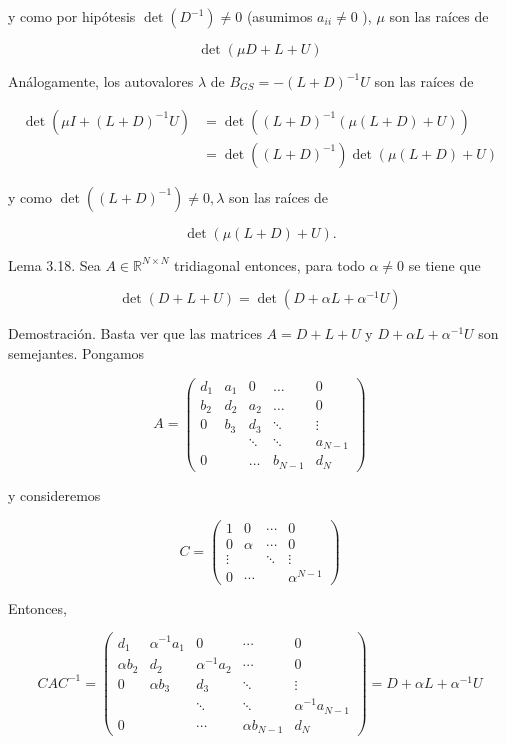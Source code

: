 \documentclass[10pt]{book}
\begin{document}
y como por hipótesis $\operatorname{det}\left(D^{-1}\right) \neq 0$ (asumimos $a_{i i} \neq 0$ ), $\mu$ son las raíces de

$$
\operatorname{det}(\mu D+L+U)
$$

Análogamente, los autovalores $\lambda$ de $B_{G S}=-(L+D)^{-1} U$ son las raíces de

$$
\begin{aligned}
\operatorname{det}\left(\mu I+(L+D)^{-1} U\right) & =\operatorname{det}\left((L+D)^{-1}(\mu(L+D)+U)\right) \\
& =\operatorname{det}\left((L+D)^{-1}\right) \operatorname{det}(\mu(L+D)+U)
\end{aligned}
$$

y como $\operatorname{det}\left((L+D)^{-1}\right) \neq 0, \lambda$ son las raíces de

$$
\operatorname{det}(\mu(L+D)+U) .
$$

Lema 3.18. Sea $A \in \mathbb{R}^{N \times N}$ tridiagonal entonces, para todo $\alpha \neq 0$ se tiene que

$$
\operatorname{det}(D+L+U)=\operatorname{det}\left(D+\alpha L+\alpha^{-1} U\right)
$$

Demostración. Basta ver que las matrices $A=D+L+U$ y $D+\alpha L+\alpha^{-1} U$ son semejantes. Pongamos

$$
A=\left(\begin{array}{ccccc}
d_{1} & a_{1} & 0 & \ldots & 0 \\
b_{2} & d_{2} & a_{2} & \ldots & 0 \\
0 & b_{3} & d_{3} & \ddots & \vdots \\
& & \ddots & \ddots & a_{N-1} \\
0 & & \ldots & b_{N-1} & d_{N}
\end{array}\right)
$$

y consideremos

$$
C=\left(\begin{array}{cccc}
1 & 0 & \cdots & 0 \\
0 & \alpha & \cdots & 0 \\
\vdots & & \ddots & \vdots \\
0 & \cdots & & \alpha^{N-1}
\end{array}\right)
$$

Entonces,

$$
C A C^{-1}=\left(\begin{array}{ccccc}
d_{1} & \alpha^{-1} a_{1} & 0 & \cdots & 0 \\
\alpha b_{2} & d_{2} & \alpha^{-1} a_{2} & \cdots & 0 \\
0 & \alpha b_{3} & d_{3} & \ddots & \vdots \\
& & \ddots & \ddots & \alpha^{-1} a_{N-1} \\
0 & & \cdots & \alpha b_{N-1} & d_{N}
\end{array}\right)=D+\alpha L+\alpha^{-1} U
$$
\end{document}
